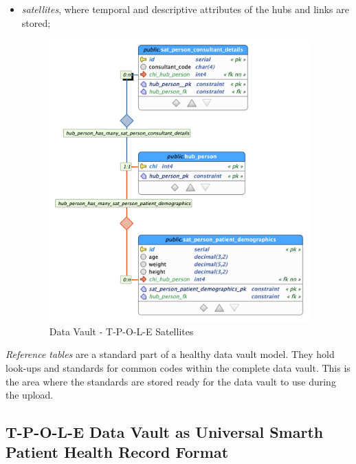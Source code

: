 \begin{itemize}
\item \emph{satellites}, where temporal and descriptive attributes of the hubs and links are stored;


\begin{figure}[H]
    \centering
    \includegraphics[width=10cm]{figures/technical/satellites.png}
    \caption{Data Vault - T-P-O-L-E Satellites}
    \label{fig:dvsatellites}
\end{figure}
\end{itemize}




\noindent
\emph{Reference tables} are a standard part of a healthy data vault model. They hold look-ups and standards for common codes within the complete data vault.
This is the area where the standards are stored ready for the data vault to use during the upload.

\subsection{T-P-O-L-E Data Vault as Universal Smarth Patient Health Record Format}


